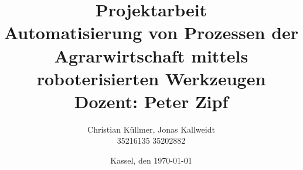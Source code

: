 \documentclass[a4paper,12pt,titlepage]{article}
\begin{document}
\title{{\textsf{Projektarbeit\\
	\glqq Automatisierung von Prozessen der Agrarwirtschaft mittels roboterisierten Werkzeugen\grqq \\
	\vspace{1ex}
	Dozent: Peter Zipf}}}
\author{Christian Küllmer, Jonas Kallweidt\\
35216135 35202882}
\date{Kassel, den \today}

\maketitle       %
\tableofcontents %
\listoffigures   %
\listoftables    %



\end{document}
